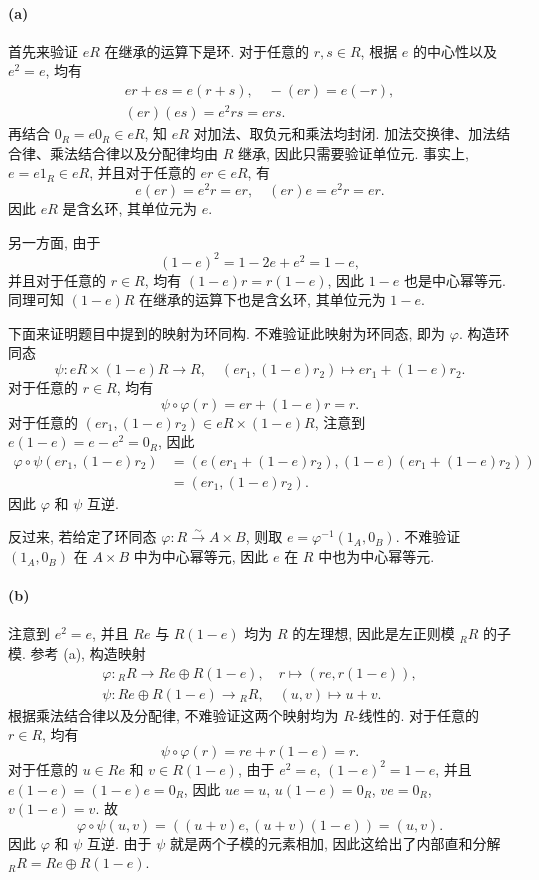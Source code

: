 \documentclass{article}
\begin{document}
\begin{solution}
	\paragraph{(a)} 首先来验证 $eR$ 在继承的运算下是环. 对于任意的 $r, s \in R$, 根据 $e$ 的中心性以及 $e^2 = e$, 均有
	\begin{gather*}
		er+es = e(r+s), \quad -(er) = e(-r),\\
		(er)(es) = e^2rs = ers.
	\end{gather*}
	再结合 $0_R = e0_R \in eR$, 知 $eR$ 对加法、取负元和乘法均封闭. 加法交换律、加法结合律、乘法结合律以及分配律均由 $R$ 继承, 因此只需要验证单位元. 事实上, $e = e1_R \in eR$, 并且对于任意的 $er \in eR$, 有
	\[ e(er) = e^2r = er, \quad (er)e = e^2r = er. \]
	因此 $eR$ 是含幺环, 其单位元为 $e$.

	另一方面, 由于
	\[ (1-e)^2 = 1-2e+e^2 = 1-e, \]
	并且对于任意的 $r \in R$, 均有 $(1-e)r = r(1-e)$, 因此 $1-e$ 也是中心幂等元. 同理可知 $(1-e)R$ 在继承的运算下也是含幺环, 其单位元为 $1-e$.

	下面来证明题目中提到的映射为环同构. 不难验证此映射为环同态, 即为 $\varphi$. 构造环同态
	\[ \psi: eR \times (1-e)R \to R, \quad (er_1, (1-e)r_2) \mapsto er_1 + (1-e)r_2. \]
	对于任意的 $r \in R$, 均有
	\[ \psi \circ \varphi(r) = er + (1-e)r = r. \]
	对于任意的 $(er_1, (1-e)r_2) \in eR \times (1-e)R$, 注意到 $e(1-e) = e - e^2 = 0_R$, 因此
	\begin{align*}
		\varphi \circ \psi(er_1, (1-e)r_2)
		&= \left( e(er_1 + (1-e)r_2), (1-e)(er_1 + (1-e)r_2) \right)\\
		&= (er_1, (1-e)r_2).
	\end{align*}
	因此 $\varphi$ 和 $\psi$ 互逆.

	反过来, 若给定了环同态 $\varphi: R \xrightarrow{\sim} A \times B$, 则取 $e = \varphi^{-1}(1_A, 0_B)$. 不难验证 $(1_A, 0_B)$ 在 $A \times B$ 中为中心幂等元, 因此 $e$ 在 $R$ 中也为中心幂等元.

	\paragraph{(b)} 注意到 $e^2 = e$, 并且 $Re$ 与 $R(1-e)$ 均为 $R$ 的左理想, 因此是左正则模 ${}_R R$ 的子模. 参考 (a), 构造映射
	\begin{gather*}
		\varphi: {}_R R \to Re \oplus R(1-e), \quad r \mapsto (re, r(1-e)),\\
		\psi: Re \oplus R(1-e) \to {}_R R, \quad (u,v) \mapsto u+v.
	\end{gather*}
	根据乘法结合律以及分配律, 不难验证这两个映射均为 $R$-线性的. 对于任意的 $r \in R$, 均有
	\[ \psi \circ \varphi(r) = re + r(1-e) = r. \]
	对于任意的 $u \in Re$ 和 $v \in R(1-e)$, 由于 $e^2 = e$, $(1-e)^2 = 1-e$, 并且 $e(1-e) = (1-e)e = 0_R$, 因此 $ue = u$, $u(1-e) = 0_R$, $ve = 0_R$, $v(1-e) = v$. 故
	\[ \varphi \circ \psi(u,v) = ((u+v)e, (u+v)(1-e)) = (u,v). \]
	因此 $\varphi$ 和 $\psi$ 互逆. 由于 $\psi$ 就是两个子模的元素相加, 因此这给出了内部直和分解 ${}_R R = Re \oplus R(1-e)$.


\end{solution}
\end{document}

